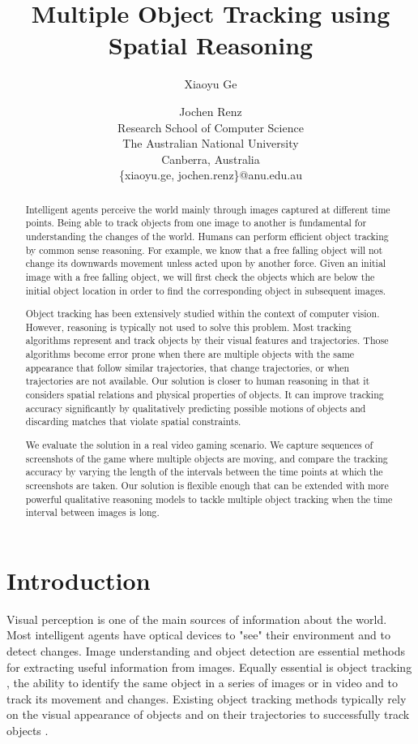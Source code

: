 \documentclass[letterpaper]{article}
\title{Multiple Object Tracking using Spatial Reasoning}
\author{Xiaoyu Ge \and Jochen Renz \\
Research School of Computer Science\\
The Australian National University \\
Canberra, Australia\\
\{xiaoyu.ge, jochen.renz\}@anu.edu.au
}
\begin{document}
\maketitle    
\begin{abstract}
Intelligent agents perceive the world mainly through images captured at  different time points. Being able to track objects from one image to another is fundamental for understanding the changes of the world. 
Humans can perform efficient object tracking by common sense reasoning. For example, we know that a free falling object will not change its downwards movement unless acted upon by another force. Given an initial image with a free falling object, we will first check the objects which are below the initial object location in order to find the corresponding object in subsequent images. 

Object tracking has been extensively studied within the context of computer vision. However, reasoning is typically not used to solve this problem. Most tracking algorithms represent and track objects by their visual features and trajectories. Those algorithms become error prone when there are multiple objects with the same appearance that follow similar trajectories, that change trajectories, or when trajectories are not available. Our solution is closer to human reasoning in that it considers spatial relations and physical properties of objects. It can improve tracking accuracy significantly by qualitatively predicting possible motions of objects and discarding matches that violate spatial constraints. 

We evaluate the solution in a real video gaming scenario. We capture sequences of screenshots of the game where multiple objects are moving, and compare the tracking accuracy by varying the length of the intervals between the time points at which the screenshots are taken. Our solution is flexible enough that can be extended with more powerful qualitative reasoning models to tackle multiple object tracking when the time interval between images is long. 
\end{abstract}
\section{Introduction}

Visual perception is one of the main sources of information about the world. Most intelligent agents have optical devices to "see" their environment and to detect changes. Image understanding \cite{sonka1999image,sridhar2011video} and object detection \cite{papageorgiou1998general} are essential methods for extracting useful information from images. Equally essential is object tracking \cite{yilmaz2006object}, the ability to identify the same object in a series of images or in video and to track its movement and changes. Existing object tracking methods typically rely on the visual appearance of objects and on their trajectories to successfully track objects \cite{yilmaz2004contour,cutler2000robust,viola2005detecting}.
\end{document}
